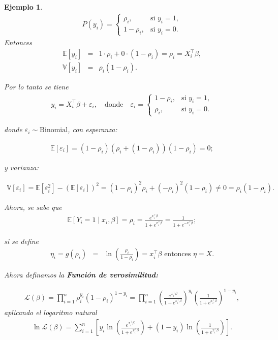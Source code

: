 \documentclass[12pt]{article}
\newtheorem{Ejem}{Ejemplo}%
\begin{document}
\begin{Ejem}
\begin{eqnarray*}
P(y_i) = 
\begin{cases}
\rho_i, & \text{si } y_i = 1, \\
1 - \rho_i, & \text{si } y_i = 0.
\end{cases}
\end{eqnarray*}
Entonces
\begin{eqnarray*}
\mathbb{E}[y_i] &=& 1 \cdot \rho_i + 0 \cdot (1 - \rho_i) = \rho_i = X_i^\top \beta,\\
\mathbb{V}[y_i] &=& \rho_i (1 - \rho_i).
\end{eqnarray*}

Por lo tanto se tiene
\begin{eqnarray*}
y_i = X_i^\top \beta + \varepsilon_i, \quad \text{donde} \quad
\varepsilon_i =
\begin{cases}
1 - \rho_i, & \text{si } y_i = 1, \\
 \rho_i, & \text{si } y_i = 0.
\end{cases}
\end{eqnarray*}


donde $\varepsilon_i \sim \text{Binomial}$, con esperanza:

\begin{eqnarray*}
\mathbb{E}[\varepsilon_i] = (1 - \rho_i)(\rho_i + (1 - \rho_i))(1 - \rho_i) = 0;
\end{eqnarray*}

y varianza:

\begin{eqnarray*}
\mathbb{V}[\varepsilon_i] = \mathbb{E}[\varepsilon_i^2] - (\mathbb{E}[\varepsilon_i])^2
= (1 - \rho_i)^2 \rho_i + (-\rho_i)^2 (1 - \rho_i) \neq 0
= \rho_i (1 - \rho_i).
\end{eqnarray*}

Ahora, se sabe que 
\begin{eqnarray*}
\mathbb{E}[Y_i = 1 \mid x_i, \beta] = \rho_i = \frac{e^{x_i^\top \beta}}{1 + e^{x_i^\top \beta}} = \frac{1}{1 + e^{-x_i^\top \beta}};
\end{eqnarray*}

si se define
\begin{eqnarray*}
\eta_i = g(\rho_i) &=& \ln \left( \frac{\rho_i}{1 - \rho_i} \right) = x_i^\top \beta \textrm{ entonces }\eta = X. 
\end{eqnarray*}

Ahora definamos la \textbf{Función de verosimilitud:}

\begin{eqnarray*}
\mathcal{L}(\beta) =\prod_{i=1}^{n} \rho_i^{y_i} (1 - \rho_i)^{1 - y_i}
= \prod_{i=1}^{n} \left( \frac{e^{x_i^\top \beta}}{1 + e^{x_i^\top \beta}} \right)^{y_i}
\left( \frac{1}{1 + e^{x_i^\top \beta}} \right)^{1 - y_i},
\end{eqnarray*}
aplicando el logaritmo natural
\begin{eqnarray*}
\ln \mathcal{L}(\beta) =\sum_{i=1}^{n} \left[y_i \ln \left( \frac{e^{x_i^\top \beta}}{1 + e^{x_i^\top \beta}} \right) + (1 - y_i) \ln \left( \frac{1}{1 + e^{x_i^\top \beta}} \right)\right].
\end{eqnarray*}


\end{Ejem}
\end{document}
